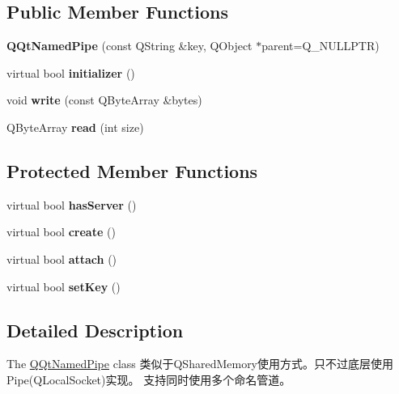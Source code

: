 \subsection*{Public Member Functions}
\begin{DoxyCompactItemize}
\item 
\mbox{\label{class_q_qt_named_pipe_ab7be4910b216ebacfabd75c1dde3207e}} 
{\bfseries Q\+Qt\+Named\+Pipe} (const Q\+String \&key, Q\+Object $\ast$parent=Q\+\_\+\+N\+U\+L\+L\+P\+TR)
\item 
\mbox{\label{class_q_qt_named_pipe_a20607e519076bf2e83ab9f1b6202b68c}} 
virtual bool {\bfseries initializer} ()
\item 
\mbox{\label{class_q_qt_named_pipe_a9a21f0bc0afeee35715bf1e827ec9f1a}} 
void {\bfseries write} (const Q\+Byte\+Array \&bytes)
\item 
\mbox{\label{class_q_qt_named_pipe_aa4b8f3a6a5c4ee13e107c465ea170060}} 
Q\+Byte\+Array {\bfseries read} (int size)
\end{DoxyCompactItemize}
\subsection*{Protected Member Functions}
\begin{DoxyCompactItemize}
\item 
\mbox{\label{class_q_qt_named_pipe_a09ae15f36781af1e6884f27839f95ffa}} 
virtual bool {\bfseries has\+Server} ()
\item 
\mbox{\label{class_q_qt_named_pipe_a441919fe26ab05753a0097c21f28c1a5}} 
virtual bool {\bfseries create} ()
\item 
\mbox{\label{class_q_qt_named_pipe_a1975252a572ddac54883a395588afd67}} 
virtual bool {\bfseries attach} ()
\item 
\mbox{\label{class_q_qt_named_pipe_a2dd9e54b685182b53252a4a0a1df1f97}} 
virtual bool {\bfseries set\+Key} ()
\end{DoxyCompactItemize}


\subsection{Detailed Description}
The \mbox{\hyperlink{class_q_qt_named_pipe}{Q\+Qt\+Named\+Pipe}} class 类似于\+Q\+Shared\+Memory使用方式。只不过底层使用\+Pipe(\+Q\+Local\+Socket)实现。 支持同时使用多个命名管道。 

